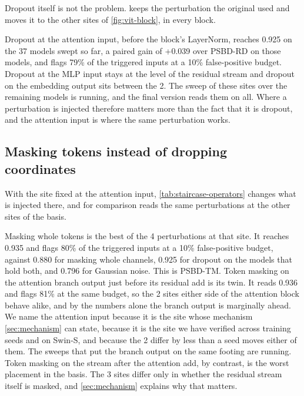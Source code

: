 Dropout itself is not the problem.  keeps the perturbation the original used and moves it to the other sites of \cref{fig:vit-block}, in every block.



Dropout at the attention input, before the block's LayerNorm, reaches 0.925 on the 37 models swept so far, a paired gain of +0.039 over PSBD-RD on those models, and flags 79\% of the triggered inputs at a 10\% false-positive budget. Dropout at the MLP input stays at the level of the residual stream and dropout on the embedding output sits between the 2. The sweep of these sites over the remaining models is running, and the final version reads them on all. Where a perturbation is injected therefore matters more than the fact that it is dropout, and the attention input is where the same perturbation works.

\subsection{Masking tokens instead of dropping coordinates}
\label{sec:results:operator}

With the site fixed at the attention input, \cref{tab:staircase-operators} changes what is injected there, and for comparison reads the same perturbations at the other sites of the basis.



Masking whole tokens is the best of the 4 perturbations at that site. It reaches 0.935 and flags 80\% of the triggered inputs at a 10\% false-positive budget, against 0.880 for masking whole channels, 0.925 for dropout on the models that hold both, and 0.796 for Gaussian noise. This is PSBD-TM. Token masking on the attention branch output just before its residual add is its twin. It reads 0.936 and flags 81\% at the same budget, so the 2 sites either side of the attention block behave alike, and by the numbers alone the branch output is marginally ahead. We name the attention input because it is the site whose mechanism \cref{sec:mechanism} can state, because it is the site we have verified across training seeds and on Swin-S, and because the 2 differ by less than a seed moves either of them. The sweeps that put the branch output on the same footing are running. Token masking on the stream after the attention add, by contrast, is the worst placement in the basis. The 3 sites differ only in whether the residual stream itself is masked, and \cref{sec:mechanism} explains why that matters.


